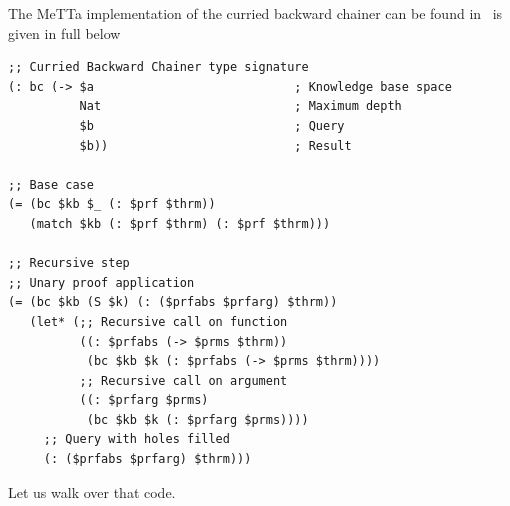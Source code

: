 \documentclass[]{report}
\begin{document}
The MeTTa implementation of the curried backward chainer can be found
in~\cite{CurriedBackwardChainer} is given in full below\pagebreak
\begin{verbatim}
;; Curried Backward Chainer type signature
(: bc (-> $a                            ; Knowledge base space
          Nat                           ; Maximum depth
          $b                            ; Query
          $b))                          ; Result

;; Base case
(= (bc $kb $_ (: $prf $thrm))
   (match $kb (: $prf $thrm) (: $prf $thrm)))

;; Recursive step
;; Unary proof application
(= (bc $kb (S $k) (: ($prfabs $prfarg) $thrm))
   (let* (;; Recursive call on function
          ((: $prfabs (-> $prms $thrm))
           (bc $kb $k (: $prfabs (-> $prms $thrm))))
          ;; Recursive call on argument
          ((: $prfarg $prms)
           (bc $kb $k (: $prfarg $prms))))
     ;; Query with holes filled
     (: ($prfabs $prfarg) $thrm)))
\end{verbatim}
Let us walk over that code.
\end{document}
